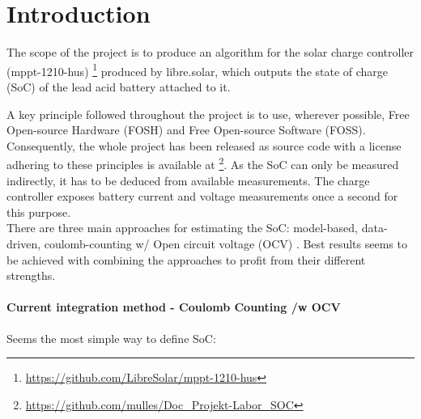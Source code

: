 


\chapter{Introduction}
\label{chap:Introduction}

The scope of the project is to produce an algorithm for the solar charge controller (mppt-1210-hus) \footnote{\url{https://github.com/LibreSolar/mppt-1210-hus}} produced by libre.solar, which outputs the state of charge (SoC) of the lead acid battery attached to it.


A key principle followed throughout the project is to use, wherever possible, Free Open-source Hardware (FOSH) and Free Open-source Software (FOSS). Consequently, the whole project has been
released as source code with a license adhering to these principles \cite{Schons_Development_and_validation_2021} is available at \footnote{ \url{https://github.com/mulles/Doc_Projekt-Labor_SOC} }. As the SoC can only be measured indirectly, it has to be deduced from available measurements.  %
The charge controller exposes battery current and voltage measurements once a second for this purpose. \\%
There are three main approaches for estimating the SoC: model-based, data-driven, coulomb-counting w/ Open circuit voltage (OCV) \cite{espedal2021current}. Best results seems to be achieved with combining the approaches to profit from their different strengths.


\subsubsection{Current integration method - Coulomb Counting /w OCV }
\label{section:CoulombCounting}

Seems the most simple way to define SoC:

